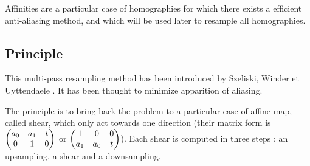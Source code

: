 

Affinities are a particular case of homographies for which there exists a efficient anti-aliasing method, and which will be used later to resample all homographies.

\subsection{Principle}
	
	This multi-pass resampling method has been introduced by Szeliski, Winder et Uyttendaele \cite{szeliski2010high}. It has been thought to minimize apparition of aliasing.

	
	The principle is to bring back the problem to a particular case of affine map, called shear, which only act towards one direction (their matrix form is $\begin{pmatrix} a_0 & a_1 & t\\ 0 & 1 & 0 \end{pmatrix}$ or $\begin{pmatrix} 1 & 0 & 0\\ a_1 & a_0 & t \end{pmatrix}$). Each shear is computed in three steps : an upsampling, a shear and a downsampling.
	
	
